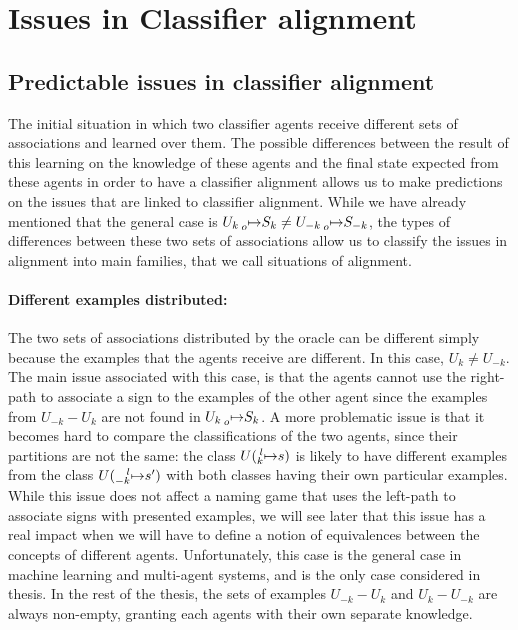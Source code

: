 \section{Issues in Classifier alignment}

\subsection{Predictable issues in classifier alignment}
The initial situation in which two classifier agents receive different sets of associations and learned over them. The possible differences between the result of this learning on the knowledge of these agents and the final state expected from these agents in order to have a classifier alignment allows us to make predictions on the issues that are linked to classifier alignment. While we have already mentioned that the general case is $U_{k} \prescript{}{o}{\mapsto} S_{k} \neq U_{-k} \prescript{}{o}{\mapsto} S_{-k}$, the types of differences between these two sets of associations allow us to classify the issues in alignment into main families, that we call situations of alignment.

\paragraph{Different examples distributed:} The two sets of associations distributed by the oracle can be different simply because the examples that the agents receive are different. In this case, $U_{k} \neq U_{-k}$. The main issue associated with this case, is that the agents cannot use the right-path to associate a sign to the examples of the other agent since the examples from $U_{-k} - U_{k}$ are not found in $U_{k} \prescript{}{o}{\mapsto} S_{k}$. A more problematic issue is that it becomes hard to compare the classifications of the two agents, since their partitions are not the same: the class $U(\prescript{l}{k}{\mapsto} s)$ is likely to have different examples from the class $U(\prescript{l}{-k}{\mapsto} s')$ with both classes having their own particular examples. While this issue does not affect a naming game that uses the left-path to associate signs with presented examples, we will see later that this issue has a real impact when we will have to define a notion of equivalences between the concepts of different agents. Unfortunately, this case is the general case in machine learning and multi-agent systems, and is the only case considered in thesis. In the rest of the thesis, the sets of examples $U_{-k} - U_{k}$ and $U_{k} - U_{-k}$ are always non-empty, granting each agents with their own separate knowledge.

